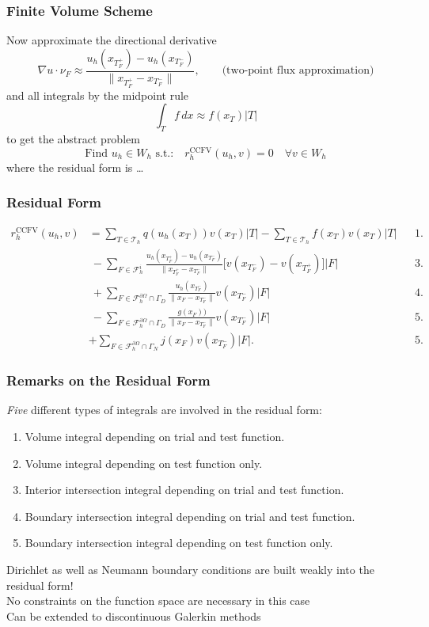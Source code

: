 \documentclass[aspectratio=169,11pt]{beamer}
\theoremstyle{definition}
\begin{document}
\begin{frame}
\frametitle{Finite Volume Scheme}
Now approximate the directional derivative
$$\nabla u\cdot \nu_F \approx \frac{u_h(x_{T_F^+})-u_h(x_{T_F^-})}{\|x_{T_F^+} - x_{T_F^-}\|},
\qquad \text{(two-point flux approximation)}$$
and all integrals by the midpoint rule
$$\int_T f \,dx \approx f(x_T)|T| $$
to get the abstract problem
\begin{equation*}
\boxed{ \text{Find $u_h\in W_h$ s.t.:} \quad r_h^{\text{CCFV}}(u_h,v) = 0 \quad \forall v \in W_h }
\end{equation*}
where the residual form is \ldots
\end{frame}

\begin{frame}
\frametitle{Residual Form}
\begin{align*}
r_h^{\text{CCFV}}(u_h,v)
& = \sum_{T\in\mathcal{T}_h} q(u_h(x_T)) v(x_T) |T|
- \sum_{T\in\mathcal{T}_h} f(x_T) v(x_T) |T| && \text{1. and 2.}\\
&\ - \sum_{F\in\mathcal{F}_h^i}
\frac{u_h(x_{T_F^+})-u_h(x_{T_F^-})}{\|x_{T_F^+} - x_{T_F^-}\|}
\bigl[v(x_{T_F^-}) - v(x_{T_F^+})\bigr] |F| && \text{3.}\\
&\ + \sum_{F\in\mathcal{F}_h^{\partial\Omega}\cap\Gamma_D}
\frac{u_h(x_{T_F^-})}{\|x_{F} - x_{T_F^-}\|} v(x_{T_F^-}) |F| && \text{4.}\\
&\ - \sum_{F\in\mathcal{F}_h^{\partial\Omega}\cap\Gamma_D}
\frac{g(x_{F}))}{\|x_{F} - x_{T_F^-}\|} v(x_{T_F^-}) |F| && \text{5.}\\
&+ \sum_{F\in\mathcal{F}_h^{\partial\Omega}\cap\Gamma_N} j(x_{F}) v(x_{T_F^-}) |F| . && \text{5.}
\end{align*}
\end{frame}

\begin{frame}
\frametitle{Remarks on the Residual Form}
\textit{Five} different types of integrals are involved in the
residual form:
\begin{enumerate}
\item Volume integral depending on trial and test function.
\item Volume integral depending on test function only.
\item Interior intersection integral depending on trial and test function.
\item Boundary intersection integral depending on trial and test function.
\item Boundary intersection integral depending on test function only.
\end{enumerate}
Dirichlet as well as Neumann boundary conditions are built weakly into the
residual form!\\
\medskip
No constraints on the function space are necessary in this case\\
\medskip
Can be extended to discontinuous Galerkin methods
\end{frame}
\end{document}

